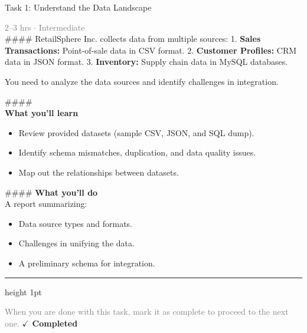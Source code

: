 \documentclass[10pt,a4paper]{article}
\begin{document}
\begin{taskbox}{Task 1: Understand the Data Landscape}

    {\small \textcolor{gray}{2--3 hrs $\cdot$ Intermediate}}\\[12pt]

    \#\#\#\#   
RetailSphere Inc. collects data from multiple sources:  
1. \textbf{Sales Transactions:} Point-of-sale data in CSV format.  
2. \textbf{Customer Profiles:} CRM data in JSON format.  
3. \textbf{Inventory:} Supply chain data in MySQL databases.  

You need to analyze the data sources and identify challenges in integration.

\#\#\#\# \\[10pt]
\vspace{8pt}
{\large \textbf{\textcolor{brandLight}{What you'll learn}}}\\[4pt]  
\begin{itemize}
    \item Review provided datasets (sample CSV, JSON, and SQL dump).  
    \item Identify schema mismatches, duplication, and data quality issues.  
    \item Map out the relationships between datasets.  
\end{itemize}

\#\#\#\# \vspace{8pt}
{\large \textbf{\textcolor{brandLight}{What you'll do}}}\\[4pt]  
A report summarizing:  
\begin{itemize}
    \item Data source types and formats.  
    \item Challenges in unifying the data.  
    \item A preliminary schema for integration.\par
\end{itemize}

    \vspace{16pt}

    \textcolor{cardBorder}{\hrule height 1pt}\vspace{8pt}

    \small \textcolor{gray}{When you are done with this task, mark it as complete to proceed to the next one.} \hfill \textbf{\textcolor{brandDark}{$\checkmark$ Completed}}

\end{taskbox}
\end{document}
